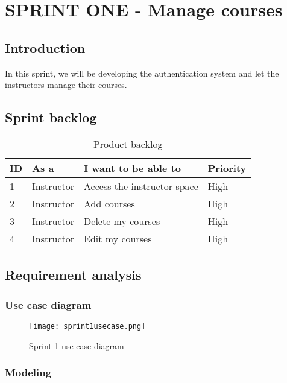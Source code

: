 \chapter{SPRINT ONE - Manage courses}
\minitoc
\newpage
\section*{Introduction}
In this sprint, we will be developing the authentication system and let the instructors manage their courses.
\section{Sprint backlog}
\begin{table}[H]
\centering
\caption{Product backlog}
\begin{tabular}{|p{1cm}|p{3cm}|p{6cm}|p{2cm}|}
\hline
\rowcolor{brown!18}\textbf{\large{ID}} & \textbf{\large{As a}} & \textbf{\large{I want to be able to}} & \textbf{\large{Priority}} \\
\hline
1& Instructor  & Access the instructor space & High\\\hline
2& Instructor & Add courses  & High\\\hline
3& Instructor & Delete my courses  & High\\\hline
4& Instructor & Edit my courses  & High\\\hline

\end{tabular}
\end{table}
\section{Requirement analysis}
\subsection{Use case diagram}

\begin{figure}[!ht]
\centering
     \texttt{[image: sprint1usecase.png]}
    \caption{Sprint 1 use case diagram}
    \label{fig:sprint1usecase}
\end{figure}

\subsection{Modeling}

